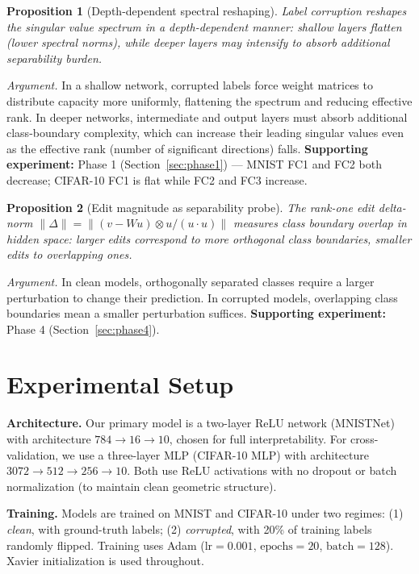 \documentclass{article}
\newtheorem{proposition}{Proposition}
\begin{document}
\begin{proposition}[Depth-dependent spectral reshaping]
\label{prop:spectral}
Label corruption reshapes the singular value spectrum in a depth-dependent manner: shallow layers flatten (lower spectral norms), while deeper layers may intensify to absorb additional separability burden.
\end{proposition}

\textit{Argument.} In a shallow network, corrupted labels force weight matrices to distribute capacity more uniformly, flattening the spectrum and reducing effective rank. In deeper networks, intermediate and output layers must absorb additional class-boundary complexity, which can increase their leading singular values even as the effective rank (number of significant directions) falls. \textbf{Supporting experiment:} Phase 1 (Section~\ref{sec:phase1}) — MNIST FC1 and FC2 both decrease; CIFAR-10 FC1 is flat while FC2 and FC3 increase.

\begin{proposition}[Edit magnitude as separability probe]
\label{prop:rome}
The rank-one edit delta-norm $\|\Delta\| = \|(v - Wu) \otimes u / (u \cdot u)\|$ measures class boundary overlap in hidden space: larger edits correspond to more orthogonal class boundaries, smaller edits to overlapping ones.
\end{proposition}

\textit{Argument.} In clean models, orthogonally separated classes require a larger perturbation to change their prediction. In corrupted models, overlapping class boundaries mean a smaller perturbation suffices. \textbf{Supporting experiment:} Phase 4 (Section~\ref{sec:phase4}).

\section{Experimental Setup}
\label{sec:setup}

\textbf{Architecture.} Our primary model is a two-layer ReLU network (MNISTNet) with architecture $784 \to 16 \to 10$, chosen for full interpretability. For cross-validation, we use a three-layer MLP (CIFAR-10 MLP) with architecture $3072 \to 512 \to 256 \to 10$. Both use ReLU activations with no dropout or batch normalization (to maintain clean geometric structure).

\textbf{Training.} Models are trained on MNIST and CIFAR-10 under two regimes: (1) \textit{clean}, with ground-truth labels; (2) \textit{corrupted}, with 20\% of training labels randomly flipped. Training uses Adam ($\text{lr}=0.001$, $\text{epochs}=20$, $\text{batch}=128$). Xavier initialization is used throughout.
\end{document}

